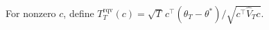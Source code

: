 For nonzero \(c\), define \(T_T^{\mathrm{rqv}}(c)=\sqrt T\,c^\top(\widehat\theta_T-\theta^*)/\sqrt{c^\top\widehat V_Tc}\).